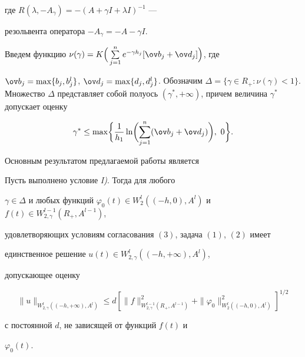 где $R(\lambda, -A_{\gamma })=-(A+\gamma I+\lambda I)^{-1}$ ---


резольвента оператора $-A_{\gamma}=-A-\gamma I$.





Введем функцию $\nu (\gamma


)=K\Big(\sum\limits_{j=1}^ne^{-\gamma h_j}[{\ov b_j}+{\ov d_j}]\Big)$, где


${\ov b_j}=\max \{ b_j, b^l_{j}\}$, ${\ov d_j}=\max \{ d_j,


d^l_{j}\} $. Обозначим $\Delta =\{ \gamma \in R_+: \nu (\gamma


)<1\}$. Множество $\Delta $ представляет собой полуось $(\gamma


^*,+\infty )$, причем величина $\gamma ^*$ допускает оценку


$$


\gamma ^*\leq \max\biggl\{ \frac{1}


{h_1}\ln\biggl(\sum\limits_{j=1}^n ({\ov b_j}+{\ov


d_j})\biggr), \ 0 \biggr\} .


$$





Основным результатом предлагаемой работы является





\begin{thm}


Пусть выполнено условие {\em I)}. Тогда для любого


$\gamma \in \Delta $ и любых функций $\varphi_0(t)\in


W^l_2((-h,0),A^l)$ и $f(t)\in W^{l-1}_{2,\gamma }(R_+,A^{l-1})$,


удовлетворяющих условиям согласования $(3)$, задача $(1)$, $(2)$ имеет


единственное решение $u(t)\in W^l_{2,\gamma }((-h,+\infty ),A^l)$,


допускающее оценку


$$


\| u\|_{W^l_{2,\gamma }((-h,+\infty


),A^l)}\leq d[\| f\| ^2_{W^{l-1}_{2,\gamma }(R_+,A^{l-1})}+ \|


\varphi_0\|^2_{W_2^l((-h,0),A^l)}]^{1/2}


$$


с постоянной $d$, не зависящей от функций $f(t)$ и


$\varphi_0(t)$.


\end{thm}





